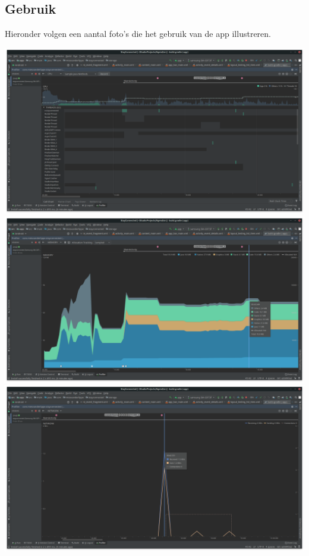 \documentclass[dutch]{report}
\begin{document}
 	\subsection{Gebruik}
 	Hieronder volgen een aantal foto's die het gebruik van de app illustreren.
 	\begin{center}
	 	\includegraphics[width=0.95\linewidth]{images/CPUusage.png}
 		\includegraphics[width=0.95\linewidth]{images/RAMusage.png}
 		\includegraphics[width=0.95\linewidth]{images/dataUsage.png}
 	\end{center}
 	
\end{document}
